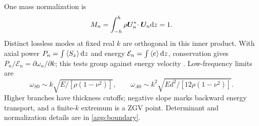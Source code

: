 One mass normalization is
\begin{equation}M_n=\int_{-h}^{h}\rho\bm{U}_n^*\!\cdot\bm{U}_n\mathrm{d} z=1.
\label{eq:modal-mass}\end{equation}
Distinct lossless modes at fixed real $k$ are orthogonal in this inner product.
With axial power $P_n=\int\left\langle S_x\right\rangle\mathrm{d} z$ and energy
$\mathcal E_n=\int\left\langle e\right\rangle\mathrm{d} z$, conservation gives
$P_n/\mathcal E_n=\partial\omega_n/\partial k$; this tests group against energy
velocity \cite{green2020}. Low-frequency limits are
\begin{equation}
\omega_{S0}\sim k\sqrt{E/[\rho(1-\nu^2)]},\qquad
\omega_{A0}\sim k^2\sqrt{Ed^2/[12\rho(1-\nu^2)]}.\label{eq:low-limits}
\end{equation}
Higher branches have thickness cutoffs; negative slope marks backward energy
transport, and a finite-$k$ extremum is a ZGV point. Determinant and normalization
details are in \cref{app:boundary}.
